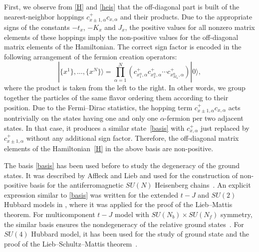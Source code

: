 \documentclass[11pt]{article}
\begin{document}
First, we observe from \eqref{H} and \eqref{heis} that the of\/f-diagonal part is built of
the nearest-neighbor hoppings $c^+_{x\pm1,\alpha}c_{x,\alpha}$ and their products.
Due to the appropriate signs of the
constants $-t_x$, $-K_x$ and $J_x$,
the positive values for all nonzero  matrix elements of these hoppings
imply  the non-positive values for the of\/f-diagonal matrix elements of the Hamiltonian.
The correct sign factor is encoded in the following arrangement of the fermion creation operators:
\begin{equation}
\label{basis}
|\{x^1\},\dots,\{x^N\}\rangle =
\prod_{\alpha=1}^N (c^+_{x^\alpha_1,\alpha}c^+_{x^\alpha_2,\alpha}\cdots c^+_{x^\alpha_{M_\alpha},\alpha}) |0\rangle,
\end{equation}
where the product is taken from the left to the right. In other words, we group together the particles
of the same f\/lavor ordering them according to their position.
Due to the Fermi--Dirac statistics, the hopping term  $c^+_{x\pm1,\alpha}c_{x,\alpha}$ acts
nontrivially on the states having one and only one $\alpha$-fermion per two adjacent states.
In that case, it produces a similar state~\eqref{basis} with $c^+_{x,\alpha}$ just replaced by $c^+_{x\pm1,\alpha}$
without any additional sign factor.
Therefore, the of\/f-diagonal matrix elements of the  Hamiltonian~\eqref{H} in the above basis are non-positive.

The basis \eqref{basis} has been used before to study the degeneracy of the ground states.
It was described by Af\/f\/leck and Lieb and used for the
construction of  non-positive basis for the antiferromagnetic $SU(N)$ Heisenberg chains~\cite{AL86}.
An  explicit expression similar to \eqref{basis} was written
for the extended $t-J$ and $SU(2)$ Hubbard models in \cite{Amb92-1,Amb92-2}, where it
was applied for the proof of the Lieb--Mattis theorem.
For multicomponent $t-J$ model with $SU(N_b)\times SU(N_f)$
symmetry, the similar basis ensures the nondegeneracy of the relative ground states~\cite{sorella96}.
For $SU(4)$ Hubbard model, it has been used for the study
of ground state and the proof of the Lieb--Schultz--Mattis theorem~\cite{LTML04}.
\end{document}
